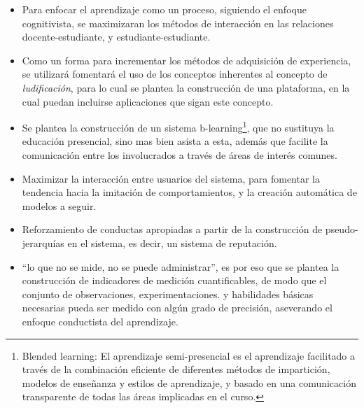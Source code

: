 \begin{itemize}
\item Para enfocar el aprendizaje como un proceso, siguiendo el enfoque
cognitivista, se maximizaran los métodos de interacción en las relaciones
docente-estudiante, y estudiante-estudiante.
\item Como un forma para incrementar los métodos de adquisición de experiencia,
se utilizará fomentará el uso de los conceptos inherentes al concepto de 
\emph{ludificación}, para lo cual se plantea la construcción de una plataforma,
en la cual puedan incluirse aplicaciones que sigan este concepto.
\item Se plantea la construcción de un sistema b-learning\footnote{Blended
learning: El aprendizaje semi-presencial es el aprendizaje facilitado a través
de la combinación eficiente de diferentes métodos de impartición, modelos de
enseñanza y estilos de aprendizaje, y basado en una comunicación transparente
de todas las áreas implicadas en el curso.}, que no sustituya la educación
presencial, sino mas bien asista a esta, además que facilite la comunicación
entre los involucrados a través de áreas de interés comunes.
\item Maximizar la interacción entre usuarios del sistema, para fomentar la
tendencia hacia la imitación de comportamientos, y la creación automática de
modelos a seguir.
\item Reforzamiento de conductas apropiadas a partir de la construcción de
pseudo-jerarquías en el sistema, es decir, un sistema de reputación.
\item ``lo que no se mide, no se puede administrar''\cite{Silva}, es por eso que
se plantea la construcción de indicadores de medición cuantificables, de modo
que el conjunto de observaciones, experimentaciones. y habilidades básicas
necesarias pueda ser medido con algún grado de precisión, aseverando el enfoque
conductista del aprendizaje.
\end{itemize}
